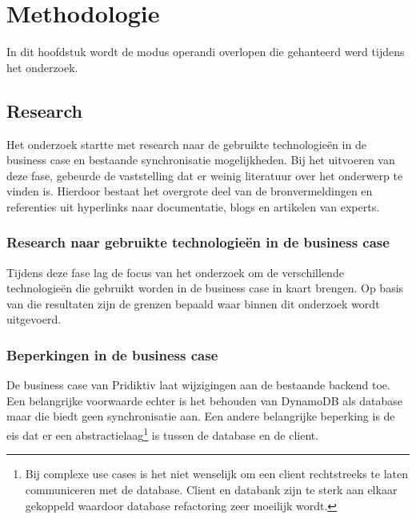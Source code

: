 
\chapter{Methodologie}
\label{ch:methodologie}
In dit hoofdstuk wordt de modus operandi overlopen die gehanteerd werd tijdens het onderzoek.
\section{Research}
Het onderzoek startte met research naar de gebruikte technologie\"en in de business case en bestaande synchronisatie mogelijkheden. Bij het uitvoeren van deze fase, gebeurde de vaststelling dat er weinig literatuur over het onderwerp te vinden is. Hierdoor bestaat het overgrote deel van de bronvermeldingen en referenties uit hyperlinks naar documentatie, blogs en artikelen van experts. 
\subsection{Research naar gebruikte technologie\"en in de business case}
Tijdens deze fase lag de focus van het onderzoek om de verschillende technologie\"en die gebruikt worden in de business case in kaart brengen. Op basis van die resultaten zijn de grenzen bepaald waar binnen dit onderzoek wordt uitgevoerd.
\clearpage
\subsection{Beperkingen in de business case}
\label{subsec:beperkingen-business-case}
De business case van Pridiktiv laat wijzigingen aan de bestaande backend toe. Een belangrijke voorwaarde echter is het behouden van DynamoDB als database maar die biedt geen synchronisatie aan. Een andere belangrijke beperking is de eis dat er een abstractielaag\footnote{Bij complexe use cases is het niet wenselijk om een client rechtstreeks te laten communiceren met de database. Client en databank zijn te sterk aan elkaar gekoppeld waardoor database refactoring zeer moeilijk wordt.} is tussen de database en de client.
